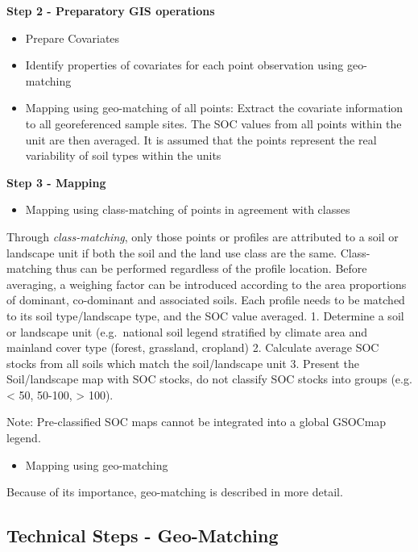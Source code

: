\documentclass[10pt,b5paper,]{book}
\providecommand{\tightlist}{%
  \setlength{\itemsep}{0pt}\setlength{\parskip}{0pt}}
\theoremstyle{definition}
\theoremstyle{definition}
\theoremstyle{definition}
\theoremstyle{remark}
\begin{document}
\textbf{Step 2 - Preparatory GIS operations}

\begin{itemize}
\tightlist
\item
  Prepare Covariates
\item
  Identify properties of covariates for each point observation using
  geo-matching
\item
  Mapping using geo-matching of all points: Extract the covariate
  information to all georeferenced sample sites. The SOC values from all
  points within the unit are then averaged. It is assumed that the
  points represent the real variability of soil types within the units
\end{itemize}

\textbf{Step 3 - Mapping}

\begin{itemize}
\tightlist
\item
  Mapping using class-matching of points in agreement with classes
\end{itemize}

Through \emph{class-matching}, only those points or profiles are
attributed to a soil or landscape unit if both the soil and the land use
class are the same. Class-matching thus can be performed regardless of
the profile location. Before averaging, a weighing factor can be
introduced according to the area proportions of dominant, co-dominant
and associated soils. Each profile needs to be matched to its soil
type/landscape type, and the SOC value averaged. 1. Determine a soil or
landscape unit (e.g.~national soil legend stratified by climate area and
mainland cover type (forest, grassland, cropland) 2. Calculate average
SOC stocks from all soils which match the soil/landscape unit 3. Present
the Soil/landscape map with SOC stocks, do not classify SOC stocks into
groups (e.g. \textless{} 50, 50-100, \textgreater{} 100).

Note: Pre-classified SOC maps cannot be integrated into a global GSOCmap
legend.

\begin{itemize}
\tightlist
\item
  Mapping using geo-matching
\end{itemize}

Because of its importance, geo-matching is described in more detail.

\hypertarget{technical-steps---geo-matching}{%
\subsection{Technical Steps -
Geo-Matching}\label{technical-steps---geo-matching}}
\end{document}
